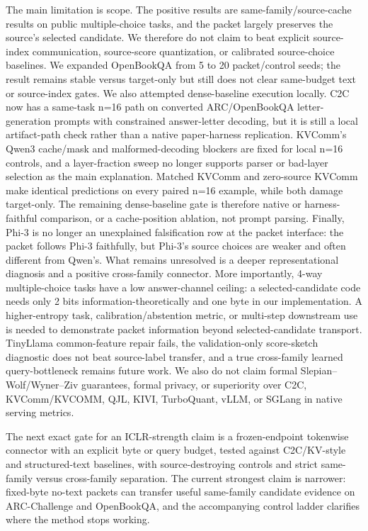 \documentclass{article}
\newcommand{\arc}{ARC-Challenge}
\newcommand{\obqa}{OpenBookQA}
\begin{document}
The main limitation is scope. The positive results are same-family/source-cache results on public multiple-choice tasks, and the packet largely preserves the source's selected candidate. We therefore do not claim to beat explicit source-index communication, source-score quantization, or calibrated source-choice baselines. We expanded \obqa{} from 5 to 20 packet/control seeds; the result remains stable versus target-only but still does not clear same-budget text or source-index gates. We also attempted dense-baseline execution locally. C2C now has a same-task n=16 path on converted ARC/OpenBookQA letter-generation prompts with constrained answer-letter decoding, but it is still a local artifact-path check rather than a native paper-harness replication. KVComm's Qwen3 cache/mask and malformed-decoding blockers are fixed for local n=16 controls, and a layer-fraction sweep no longer supports parser or bad-layer selection as the main explanation. Matched KVComm and zero-source KVComm make identical predictions on every paired n=16 example, while both damage target-only. The remaining dense-baseline gate is therefore native or harness-faithful comparison, or a cache-position ablation, not prompt parsing. Finally, Phi-3 is no longer an unexplained falsification row at the packet interface: the packet follows Phi-3 faithfully, but Phi-3's source choices are weaker and often different from Qwen's. What remains unresolved is a deeper representational diagnosis and a positive cross-family connector. More importantly, 4-way multiple-choice tasks have a low answer-channel ceiling: a selected-candidate code needs only 2 bits information-theoretically and one byte in our implementation. A higher-entropy task, calibration/abstention metric, or multi-step downstream use is needed to demonstrate packet information beyond selected-candidate transport. TinyLlama common-feature repair fails, the validation-only score-sketch diagnostic does not beat source-label transfer, and a true cross-family learned query-bottleneck remains future work. We also do not claim formal Slepian--Wolf/Wyner--Ziv guarantees, formal privacy, or superiority over C2C, KVComm/KVCOMM, QJL, KIVI, TurboQuant, vLLM, or SGLang in native serving metrics.

The next exact gate for an ICLR-strength claim is a frozen-endpoint tokenwise connector with an explicit byte or query budget, tested against C2C/KV-style and structured-text baselines, with source-destroying controls and strict same-family versus cross-family separation. The current strongest claim is narrower: fixed-byte no-text packets can transfer useful same-family candidate evidence on \arc{} and \obqa{}, and the accompanying control ladder clarifies where the method stops working.
\end{document}
